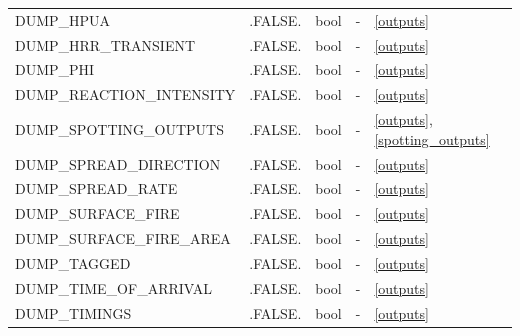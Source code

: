 \begin{landscape}
\begin{center}
\begin{longtable}{lllll}
DUMP\_HPUA                                   & .FALSE.                    & bool                   & -                                  & \ref{outputs}                        \\
DUMP\_HRR\_TRANSIENT                         & .FALSE.                    & bool                   & -                                  & \ref{outputs}                        \\
DUMP\_PHI                                    & .FALSE.                    & bool                   & -                                  & \ref{outputs}                        \\
DUMP\_REACTION\_INTENSITY                    & .FALSE.                    & bool                   & -                                  & \ref{outputs}                        \\
DUMP\_SPOTTING\_OUTPUTS                      & .FALSE.                    & bool                   & -                                  & \ref{outputs}, \ref{spotting_outputs}                       \\
DUMP\_SPREAD\_DIRECTION                      & .FALSE.                    & bool                   & -                                  & \ref{outputs}                        \\
DUMP\_SPREAD\_RATE                           & .FALSE.                    & bool                   & -                                  & \ref{outputs}                        \\
DUMP\_SURFACE\_FIRE                          & .FALSE.                    & bool                   & -                                  & \ref{outputs}                        \\
DUMP\_SURFACE\_FIRE\_AREA                    & .FALSE.                    & bool                   & -                                  & \ref{outputs}                        \\
DUMP\_TAGGED                                 & .FALSE.                    & bool                   & -                                  & \ref{outputs}                        \\
DUMP\_TIME\_OF\_ARRIVAL                      & .FALSE.                    & bool                   & -                                  & \ref{outputs}                        \\
DUMP\_TIMINGS                                & .FALSE.                    & bool                   & -                                  & \ref{outputs}                        \\

\end{longtable}
\end{center}
\end{landscape}
